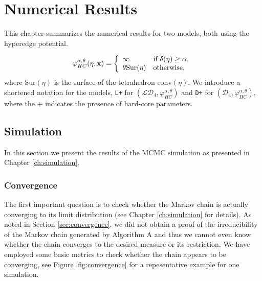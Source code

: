 \chapter{Numerical Results}\label{ch:numeric}
This chapter summarizes the numerical results for two models, both using the hyperedge potential.

\begin{equation}\label{eq:model}
	\varphi_{HC}^{\alpha,\theta}(\eta,{\mathbf{x}}) = 
\left\{
    \begin{array}{ll}
	    \infty & \mbox{if } \delta(\eta)\geq \alpha, \\
	    \theta \mathrm{Sur}(\eta) & \mbox{otherwise, }
    \end{array}
    \right.
\end{equation}
where $\mathrm{Sur}(\eta)$ is the surface of the tetrahedron $\mathrm{conv}(\eta)$. We introduce a shortened notation for the models, \texttt{L+} for $(\mathcal {LD}_4, \varphi^{\alpha,\theta}_{HC})$ and \texttt{D+} for $(\mathcal D_4, \varphi^{\alpha,\theta}_{HC})$, where the $+$ indicates the presence of hard-core parameters.

 

\section{Simulation}
In this section we present the results of the MCMC simulation as presented in Chapter \ref{ch:simulation}.

\subsection{Convergence}
The first important question is to check whether the Markov chain is actually converging to its limit distribution (see Chapter \ref{ch:simulation} for details). As noted in Section \ref{sec:convergence}, we did not obtain a proof of the irreducibility of the Markov chain generated by Algorithm A and thus we cannot even know whether the chain converges to the desired measure or its restriction. We have employed some basic metrics to check whether the chain appears to be converging, see Figure \ref{fig:convergence} for a repesentative example for one simulation.

